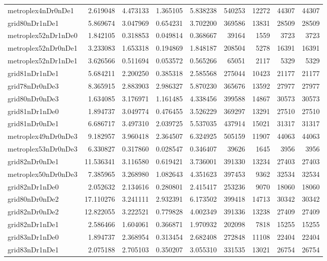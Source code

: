 \begin{longtable}{|l|r|r|r|r|r|r|r|r|}
metroplex4nDr0nDe1 & 2.619048 & 4.473133 & 1.365105 & 5.838238 & 540253 & 12272 & 44307 & 44307 \\
grid80nDr1nDe1 & 5.869674 & 3.047969 & 0.654231 & 3.702200 & 369586 & 13831 & 28509 & 28509 \\
metroplex52nDr1nDe0 & 1.842105 & 0.318853 & 0.049814 & 0.368667 & 39164 & 1559 & 3723 & 3723 \\
metroplex52nDr0nDe1 & 3.233083 & 1.653318 & 0.194869 & 1.848187 & 208504 & 5278 & 16391 & 16391 \\
metroplex52nDr1nDe1 & 3.626566 & 0.511694 & 0.053572 & 0.565266 & 65051 & 2117 & 5329 & 5329 \\
grid81nDr1nDe1 & 5.684211 & 2.200250 & 0.385318 & 2.585568 & 275044 & 10423 & 21177 & 21177 \\
grid78nDr0nDe3 & 8.365915 & 2.883903 & 2.986327 & 5.870230 & 365676 & 13592 & 27977 & 27977 \\
grid80nDr0nDe3 & 1.634085 & 3.176971 & 1.161485 & 4.338456 & 399588 & 14867 & 30573 & 30573 \\
grid81nDr1nDe0 & 1.894737 & 3.049774 & 0.476455 & 3.526229 & 369297 & 13291 & 27510 & 27510 \\
grid81nDr0nDe1 & 6.686717 & 3.497310 & 2.039725 & 5.537035 & 437914 & 15021 & 31317 & 31317 \\
metroplex49nDr0nDe3 & 9.182957 & 3.960418 & 2.364507 & 6.324925 & 505159 & 11907 & 44063 & 44063 \\
metroplex53nDr0nDe3 & 6.330827 & 0.317860 & 0.028547 & 0.346407 & 39626 & 1645 & 3956 & 3956 \\
grid82nDr0nDe1 & 11.536341 & 3.116580 & 0.619421 & 3.736001 & 391330 & 13234 & 27403 & 27403 \\
metroplex50nDr0nDe3 & 7.385965 & 3.268980 & 1.082643 & 4.351623 & 397453 & 9362 & 32534 & 32534 \\
grid82nDr1nDe0 & 2.052632 & 2.134616 & 0.280801 & 2.415417 & 253236 & 9070 & 18060 & 18060 \\
grid80nDr0nDe2 & 17.110276 & 3.241111 & 2.932391 & 6.173502 & 399418 & 14713 & 30342 & 30342 \\
grid82nDr0nDe2 & 12.822055 & 3.222521 & 0.779828 & 4.002349 & 391336 & 13238 & 27409 & 27409 \\
grid82nDr1nDe1 & 2.586466 & 1.604061 & 0.366871 & 1.970932 & 202098 & 7818 & 15255 & 15255 \\
grid83nDr1nDe0 & 1.894737 & 2.368954 & 0.313454 & 2.682408 & 272848 & 11108 & 22404 & 22404 \\
grid83nDr1nDe1 & 2.075188 & 2.705103 & 0.350207 & 3.055310 & 331535 & 13021 & 26754 & 26754 \\

\end{longtable}
